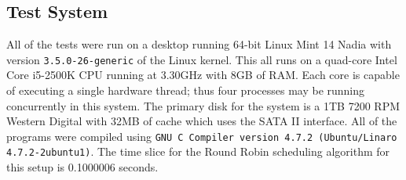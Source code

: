 \subsection{Test System}

All of the tests were run on a desktop running 64-bit Linux Mint 14 Nadia with version \texttt{3.5.0-26-generic} of the Linux kernel.  This all runs on a quad-core Intel Core i5-2500K CPU running at 3.30GHz with 8GB of RAM.  Each core is capable of executing a single hardware thread; thus four processes may be running concurrently in this system.  The primary disk for the system is a 1TB 7200 RPM Western Digital with 32MB of cache which uses the SATA II interface.  All of the programs were compiled using \texttt{GNU C Compiler version 4.7.2 (Ubuntu/Linaro 4.7.2-2ubuntu1)}.  The time slice for the Round Robin scheduling algorithm for this setup is 0.1000006 seconds.
